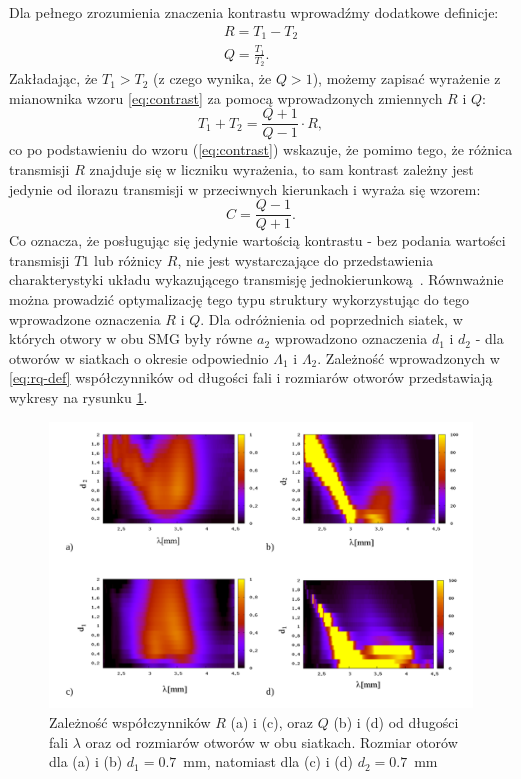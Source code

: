 Dla pełnego zrozumienia znaczenia kontrastu wprowadźmy dodatkowe definicje:
\begin{equation}
	\begin{gathered}
	R=T_1-T_2 \\
	Q=\frac{T_1}{T_2}.
	\end{gathered}
	\label{eq:rq-def}
\end{equation}
Zakładając, że $T_1>T_2$ (z czego wynika, że $Q>1$), możemy zapisać wyrażenie z mianownika wzoru \ref{eq:contrast} za pomocą wprowadzonych zmiennych $R$ i $Q$:
\begin{equation}
	T_1+T_2=\frac{Q+1}{Q-1} \cdot R,
\end{equation}
co po podstawieniu do wzoru (\ref{eq:contrast}) wskazuje, że pomimo tego, że różnica transmisji $R$  znajduje się w liczniku wyrażenia, to sam kontrast zależny jest jedynie od ilorazu transmisji w przeciwnych kierunkach i wyraża się wzorem:
\begin{equation}
	C=\frac{Q-1}{Q+1}
	\label{eq:contrast-Q}.
\end{equation}
Co oznacza, że posługując się jedynie wartością kontrastu - bez podania wartości transmisji $T1$ lub różnicy $R$, nie jest wystarczające do przedstawienia charakterystyki układu wykazującego transmisję jednokierunkową~\cite{stolarek2013broadband}. Równważnie można prowadzić optymalizację tego typu struktury wykorzystując do tego wprowadzone oznaczenia $R$ i $Q$. Dla odróżnienia od poprzednich siatek, w których otwory w obu SMG były równe $a_2$ wprowadzono oznaczenia $d_1$ i $d_2$ - dla otworów w siatkach o okresie odpowiednio $\Lambda_1$ i $\Lambda_2$. Zależność wprowadzonych w \ref{eq:rq-def} współczynników od długości fali i rozmiarów otworów przedstawiają wykresy na rysunku \ref{fig:qr-od-d}.

\begin{figure}[tb]
	\includegraphics[width=\textwidth]{images/dmg/kontrast_maps.png}
	\caption{Zależność współczynników $R$ (a) i (c), oraz $Q$ (b) i (d) od długości fali $\lambda$ oraz od rozmiarów otworów w obu siatkach. Rozmiar otorów dla (a) i (b) $d_1=0.7$~mm, natomiast dla (c) i (d) $d_2=0.7$~mm }
	\label{fig:qr-od-d}
\end{figure}

